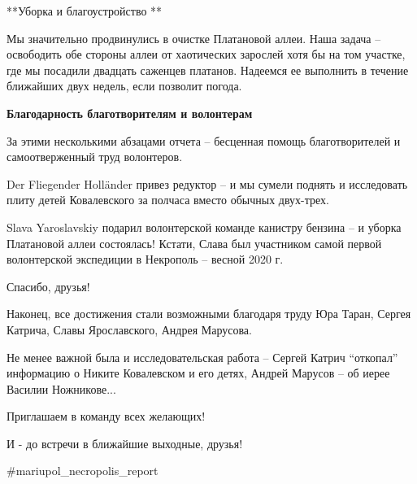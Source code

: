 **Уборка и благоустройство **

Мы значительно продвинулись в очистке Платановой аллеи. Наша задача –
освободить обе стороны аллеи от хаотических зарослей хотя бы на том участке,
где мы посадили двадцать саженцев платанов. Надеемся ее выполнить в течение
ближайших двух недель, если позволит погода.

\textbf{Благодарность благотворителям и волонтерам}

За этими несколькими абзацами отчета – бесценная помощь благотворителей и самоотверженный труд волонтеров.

Der Fliegender Holländer привез редуктор – и мы сумели поднять и исследовать плиту детей Ковалевского за полчаса вместо обычных двух-трех.

Slava Yaroslavskiy подарил волонтерской команде канистру бензина – и уборка
Платановой аллеи состоялась! Кстати, Слава был участником самой первой
волонтерской экспедиции в Некрополь – весной 2020 г. 🙂

Спасибо, друзья!

Наконец, все достижения стали возможными благодаря труду Юра Таран, Сергея Катрича, Славы Ярославского, Андрея Марусова.

Не менее важной была и исследовательская работа – Сергей Катрич \enquote{откопал}
информацию о Никите Ковалевском и его детях, Андрей Марусов – об иерее Василии
Ножникове...

Приглашаем в команду всех желающих!

И - до встречи в ближайшие выходные, друзья!

\#mariupol\_necropolis\_report
